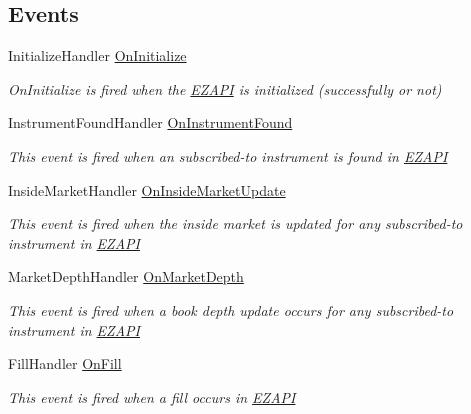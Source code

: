 \subsection*{Events}
\begin{DoxyCompactItemize}
\item 
Initialize\-Handler \hyperlink{class_e_z_a_p_i_1_1_t_t_a_p_i_functions_aa3e534f11319b72732f54427aabcaddf}{On\-Initialize}
\begin{DoxyCompactList}\small\item\em On\-Initialize is fired when the \hyperlink{namespace_e_z_a_p_i}{E\-Z\-A\-P\-I} is initialized (successfully or not) \end{DoxyCompactList}\item 
Instrument\-Found\-Handler \hyperlink{class_e_z_a_p_i_1_1_t_t_a_p_i_functions_a3212fe2094af653fbb44b82ec759cad0}{On\-Instrument\-Found}
\begin{DoxyCompactList}\small\item\em This event is fired when an subscribed-\/to instrument is found in \hyperlink{namespace_e_z_a_p_i}{E\-Z\-A\-P\-I} \end{DoxyCompactList}\item 
Inside\-Market\-Handler \hyperlink{class_e_z_a_p_i_1_1_t_t_a_p_i_functions_a61d320755a386fecd0db718af12325e8}{On\-Inside\-Market\-Update}
\begin{DoxyCompactList}\small\item\em This event is fired when the inside market is updated for any subscribed-\/to instrument in \hyperlink{namespace_e_z_a_p_i}{E\-Z\-A\-P\-I} \end{DoxyCompactList}\item 
Market\-Depth\-Handler \hyperlink{class_e_z_a_p_i_1_1_t_t_a_p_i_functions_aeef24116eebd75f30500949005c2f0b6}{On\-Market\-Depth}
\begin{DoxyCompactList}\small\item\em This event is fired when a book depth update occurs for any subscribed-\/to instrument in \hyperlink{namespace_e_z_a_p_i}{E\-Z\-A\-P\-I} \end{DoxyCompactList}\item 
Fill\-Handler \hyperlink{class_e_z_a_p_i_1_1_t_t_a_p_i_functions_a89427d6aa5c073e4eae6857f65e0fe40}{On\-Fill}
\begin{DoxyCompactList}\small\item\em This event is fired when a fill occurs in \hyperlink{namespace_e_z_a_p_i}{E\-Z\-A\-P\-I} \end{DoxyCompactList}\item 

\end{DoxyCompactItemize}
